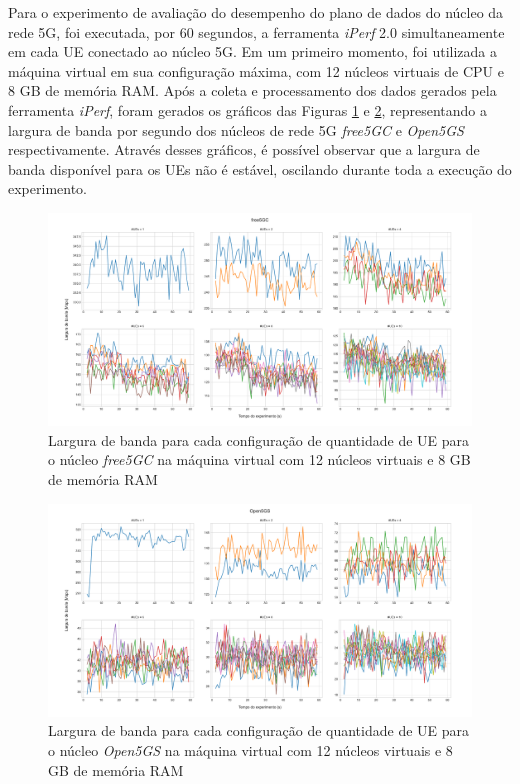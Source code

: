 Para o experimento de avaliação do desempenho do plano de dados do núcleo da rede 5G, foi executada, por 60 segundos, a ferramenta \textit{iPerf} 2.0 simultaneamente em cada UE conectado ao núcleo 5G.
Em um primeiro momento, foi utilizada a máquina virtual em sua configuração máxima, com 12 núcleos virtuais de CPU e 8 GB de memória RAM.
Após a coleta e processamento dos dados gerados pela ferramenta \textit{iPerf}, foram gerados os gráficos das Figuras \ref{fig:exp2_free5gc_12-8} e \ref{fig:exp2_open5gs_12-8}, representando a largura de banda por segundo dos núcleos de rede 5G \textit{free5GC} e \textit{Open5GS} respectivamente.
Através desses gráficos, é possível observar que a largura de banda disponível para os UEs não é estável, oscilando durante toda a execução do experimento.

\begin{figure}[!h]
    \centering
    \includegraphics[width=1\textwidth]{TG2/Chapters/DataAnalysis/Figures/EXP2-free5GC-12C-8GB.pdf}
    \caption{Largura de banda para cada configuração de quantidade de UE para o núcleo \textit{free5GC} na máquina virtual com 12 núcleos virtuais e 8 GB de memória RAM}
    \label{fig:exp2_free5gc_12-8}
\end{figure}

\begin{figure}[!h]
    \centering
    \includegraphics[width=1\textwidth]{TG2/Chapters/DataAnalysis/Figures/EXP2-Open5GS-12C-8GB.pdf}
    \caption{Largura de banda para cada configuração de quantidade de UE para o núcleo \textit{Open5GS} na máquina virtual com 12 núcleos virtuais e 8 GB de memória RAM}
    \label{fig:exp2_open5gs_12-8}
\end{figure}

